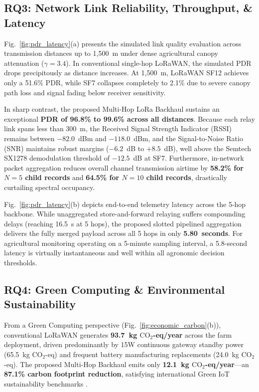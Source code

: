 \documentclass[conference]{IEEEtran}
\begin{document}
\subsection{RQ3: Network Link Reliability, Throughput, \& Latency}
Fig.~\ref{fig:pdr_latency}(a) presents the simulated link quality evaluation across transmission distances up to 1,500~m under dense agricultural canopy attenuation ($\gamma = 3.4$). In conventional single-hop LoRaWAN, the simulated PDR drops precipitously as distance increases. At 1,500~m, LoRaWAN SF12 achieves only a 51.6\% PDR, while SF7 collapses completely to 2.1\% due to severe canopy path loss and signal fading below receiver sensitivity. 

In sharp contrast, the proposed Multi-Hop LoRa Backhaul sustains an exceptional \textbf{PDR of 96.8\% to 99.6\% across all distances}. Because each relay link spans less than 300~m, the Received Signal Strength Indicator (RSSI) remains between $-82.0$~dBm and $-118.0$~dBm, and the Signal-to-Noise Ratio (SNR) maintains robust margins ($-6.2$~dB to $+8.5$~dB), well above the Semtech SX1278 demodulation threshold of $-12.5$~dB at SF7. Furthermore, in-network packet aggregation reduces overall channel transmission airtime by \textbf{58.2\% for $N=5$ child records} and \textbf{64.5\% for $N=10$ child records}, drastically curtailing spectral occupancy. 

Fig.~\ref{fig:pdr_latency}(b) depicts end-to-end telemetry latency across the 5-hop backbone. While unaggregated store-and-forward relaying suffers compounding delays (reaching 16.5~s at 5 hops), the proposed slotted pipelined aggregation delivers the fully merged payload across all 5 hops in only \textbf{5.80~seconds}. For agricultural monitoring operating on a 5-minute sampling interval, a 5.8-second latency is virtually instantaneous and well within all agronomic decision thresholds.

\subsection{RQ4: Green Computing \& Environmental Sustainability}
From a Green Computing perspective (Fig.~\ref{fig:economic_carbon}(b)), conventional LoRaWAN generates \textbf{93.7~kg $\text{CO}_2$-eq/year} across the farm deployment, driven predominantly by 15W continuous gateway standby power (65.5~kg $\text{CO}_2$-eq) and frequent battery manufacturing replacements (24.0~kg $\text{CO}_2$-eq). The proposed Multi-Hop Backhaul emits only \textbf{12.1~kg $\text{CO}_2$-eq/year}—an \textbf{87.1\% carbon footprint reduction}, satisfying international Green IoT sustainability benchmarks \cite{zhu2015green}.
\end{document}
